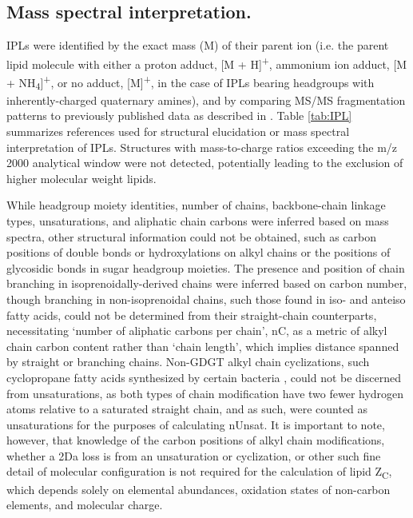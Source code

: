 \subsection{Mass spectral interpretation.} IPLs were identified by the exact mass (M) of their parent ion (i.e. the parent lipid molecule with either a proton adduct, [M + H]\textsuperscript{+}, ammonium ion adduct, [M + NH\textsubscript{4}]\textsuperscript{+}, or no adduct, [M]\textsuperscript{+}, in the case of IPLs bearing headgroups with inherently-charged quaternary amines), and by comparing MS/MS fragmentation patterns to previously published data as described in \cite{Sturt_Intact_2004}. Table \ref{tab:IPL} summarizes references used for structural elucidation or mass spectral interpretation of IPLs. Structures with mass-to-charge ratios exceeding the m/z 2000 analytical window were not detected, potentially leading to the exclusion of higher molecular weight lipids.

While headgroup moiety identities, number of chains, backbone-chain linkage types, unsaturations, and aliphatic chain carbons were inferred based on mass spectra, other structural information could not be obtained, such as carbon positions of double bonds or hydroxylations on alkyl chains or the positions of glycosidic bonds in sugar headgroup moieties. The presence and position of chain branching in isoprenoidally-derived chains were inferred based on carbon number, though branching in non-isoprenoidal chains, such those found in iso- and anteiso fatty acids, could not be determined from their straight-chain counterparts, necessitating `number of aliphatic carbons per chain', nC, as a metric of alkyl chain carbon content rather than `chain length', which implies distance spanned by straight or branching chains. Non-GDGT alkyl chain cyclizations, such cyclopropane fatty acids synthesized by certain bacteria \citep{grogan1997cyclopropane}, could not be discerned from unsaturations, as both types of chain modification have two fewer hydrogen atoms relative to a saturated straight chain, and as such, were counted as unsaturations for the purposes of calculating nUnsat. It is important to note, however, that knowledge of the carbon positions of alkyl chain modifications, whether a 2Da loss is from an unsaturation or cyclization, or other such fine detail of molecular configuration is not required for the calculation of lipid Z\textsubscript{C}, which depends solely on elemental abundances, oxidation states of non-carbon elements, and molecular charge.

